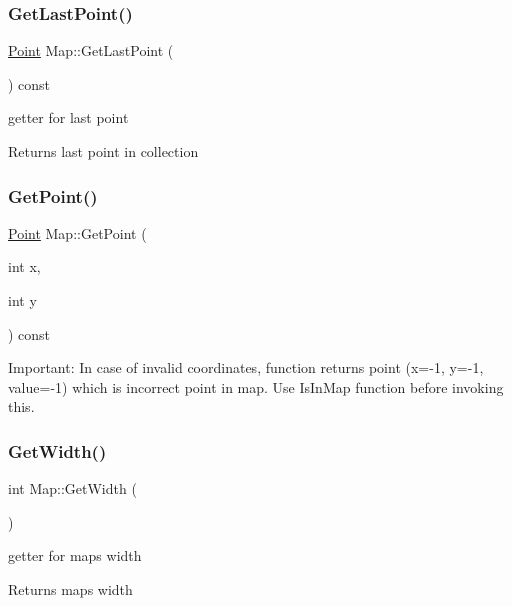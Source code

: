 \subsubsection{\texorpdfstring{Get\+Last\+Point()}{GetLastPoint()}}
{\footnotesize\ttfamily \mbox{\hyperlink{class_point}{Point}} Map\+::\+Get\+Last\+Point (\begin{DoxyParamCaption}{ }\end{DoxyParamCaption}) const}



getter for last point 

\begin{DoxyReturn}{Returns}
last point in collection 
\end{DoxyReturn}
\mbox{\label{class_map_a9f7239d47a8e426590e98b0fd07c0604}} 
\subsubsection{\texorpdfstring{Get\+Point()}{GetPoint()}}
{\footnotesize\ttfamily \mbox{\hyperlink{class_point}{Point}} Map\+::\+Get\+Point (\begin{DoxyParamCaption}\item[{int}]{x,  }\item[{int}]{y }\end{DoxyParamCaption}) const}

Important\+: In case of invalid coordinates, function returns point (x=-\/1, y=-\/1, value=-\/1) which is incorrect point in map. Use Is\+In\+Map function before invoking this. \mbox{\label{class_map_aeca77ed7c01dec1e8effa05f0e08c266}} 
\subsubsection{\texorpdfstring{Get\+Width()}{GetWidth()}}
{\footnotesize\ttfamily int Map\+::\+Get\+Width (\begin{DoxyParamCaption}{ }\end{DoxyParamCaption})}



getter for map\textquotesingle{}s width 

\begin{DoxyReturn}{Returns}
map\textquotesingle{}s width 
\end{DoxyReturn}
\mbox{\label{class_map_a20da42fe27ba40a81ebf25947b8a46fc}} 
